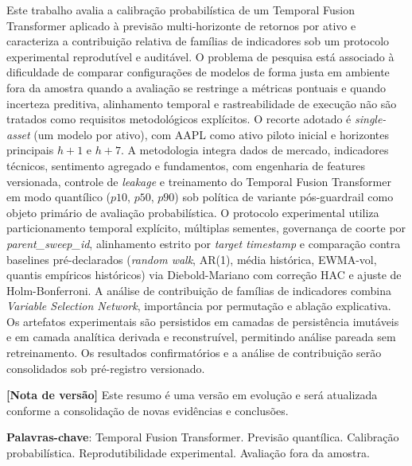\begin{resumo}

Este trabalho avalia a calibração probabilística de um Temporal Fusion Transformer aplicado à previsão multi-horizonte de retornos por ativo e caracteriza a contribuição relativa de famílias de indicadores sob um protocolo experimental reprodutível e auditável. O problema de pesquisa está associado à dificuldade de comparar configurações de modelos de forma justa em ambiente fora da amostra quando a avaliação se restringe a métricas pontuais e quando incerteza preditiva, alinhamento temporal e rastreabilidade de execução não são tratados como requisitos metodológicos explícitos. O recorte adotado é \textit{single-asset} (um modelo por ativo), com AAPL como ativo piloto inicial e horizontes principais $h+1$ e $h+7$. A metodologia integra dados de mercado, indicadores técnicos, sentimento agregado e fundamentos, com engenharia de features versionada, controle de \textit{leakage} e treinamento do Temporal Fusion Transformer em modo quantílico ($p10$, $p50$, $p90$) sob política de variante pós-guardrail como objeto primário de avaliação probabilística. O protocolo experimental utiliza particionamento temporal explícito, múltiplas sementes, governança de coorte por \textit{parent\_sweep\_id}, alinhamento estrito por \textit{target timestamp} e comparação contra baselines pré-declarados (\textit{random walk}, AR(1), média histórica, EWMA-vol, quantis empíricos históricos) via Diebold-Mariano com correção HAC e ajuste de Holm-Bonferroni. A análise de contribuição de famílias de indicadores combina \textit{Variable Selection Network}, importância por permutação e ablação explicativa. Os artefatos experimentais são persistidos em camadas de persistência imutáveis e em camada analítica derivada e reconstruível, permitindo análise pareada sem retreinamento. Os resultados confirmatórios e a análise de contribuição serão consolidados sob pré-registro versionado.

\textbf{[Nota de versão]} Este resumo é uma versão em evolução e será atualizada conforme a consolidação de novas evidências e conclusões.

\textbf{Palavras-chave}: Temporal Fusion Transformer. Previsão quantílica. Calibração probabilística. Reprodutibilidade experimental. Avaliação fora da amostra.

\end{resumo}
